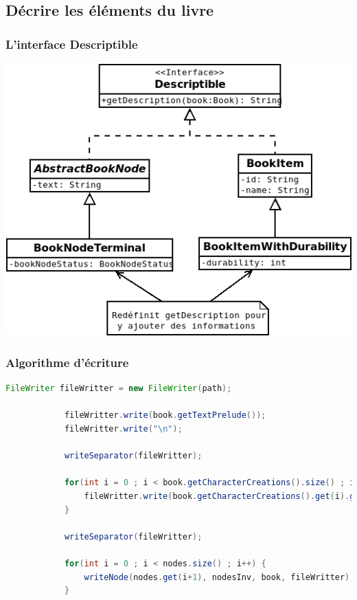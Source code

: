 \documentclass[beamer]{BetterDocument}
\begin{document}
	\subsection{Décrire les éléments du livre}
	\begin{frame}
		\frametitle{L'interface \textbf{Descriptible}}

		\center\includegraphics[height=0.7\paperheight, keepaspectratio]{img/descriptible.png}
	\end{frame}

	\begin{frame}[fragile]
		\frametitle{Algorithme d'écriture}

		\begin{lstlisting}[gobble=12, language=java,
    basicstyle=\ttfamily\fontsize{7}{9}\selectfont]
			FileWriter fileWritter = new FileWriter(path);

			fileWritter.write(book.getTextPrelude());
			fileWritter.write("\n");

			writeSeparator(fileWritter);

			for(int i = 0 ; i < book.getCharacterCreations().size() ; i++) {
				fileWritter.write(book.getCharacterCreations().get(i).getDescription(book));
			}

			writeSeparator(fileWritter);

			for(int i = 0 ; i < nodes.size() ; i++) {
				writeNode(nodes.get(i+1), nodesInv, book, fileWritter);
			}
		\end{lstlisting}
	\end{frame}
\end{document}

